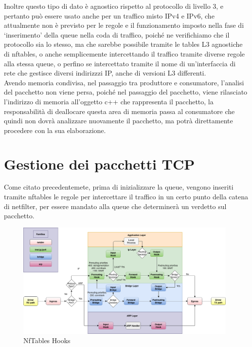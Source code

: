 Inoltre questo tipo di dato è agnostico rispetto al protocollo di livello 3, e pertanto può essere usato anche per un traffico misto IPv4 e IPv6, che attualmente
non è previsto per le regole e il funzionamento imposto nella fase di `inserimento' della queue nella coda di traffico, poiché ne verifichiamo che il protocollo
sia lo stesso, ma che sarebbe possibile tramite le tables L3 agnostiche di nftables, o anche semplicemente intercettando il traffico tramite diverse regole alla stessa queue,
o perfino se intercettato tramite il nome di un'interfaccia di rete che gestisce diversi indirizzzi IP, anche di versioni L3 differenti.\\
Avendo memoria condivisa, nel passaggio tra produttore e consumatore, l'analisi del pacchetto non viene persa, poiché nel passaggio del pacchetto, viene rilasciato l'indirizzo
di memoria all'oggetto c++ che rappresenta il pacchetto, la responsabilità di deallocare questa area di memoria passa al consumatore che quindi non dovrà
analizzare nuovamente il pacchetto, ma potrà direttamente procedere con la sua elaborazione.

\section{Gestione dei pacchetti TCP}

Come citato precedentemete, prima di inizializzare la queue, vengono inseriti tramite nftables le regole per intercettare il traffico in un certo punto della catena
di netfilter, per essere mandato alla queue che determinerà un verdetto sul pacchetto.\\

\begin{figure}[H]
    \centering
    \includegraphics[width=0.98\textwidth]{images/chapter3/nf-hooks.png}
    \caption{NfTables Hooks}\label{fig:nftables_hooks}
\end{figure}

